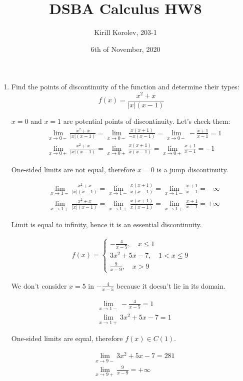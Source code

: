 \documentclass{article}
\title{DSBA Calculus HW8}
\author{Kirill Korolev, 203-1}
\date{6th of November, 2020}
\begin{document}
	
\maketitle

\begin{enumerate}
\item Find the points of discontinuity of the function and determine their types:
\[f(x)=\frac{x^2+x}{|x|(x-1)}\]

$x=0$ and $x=1$ are potential points of discontinuity. Let's check them:
\begin{align*}
&\lim_{x \to 0-} \frac{x^2+x}{|x|(x-1)}=\lim_{x \to 0-} \frac{x(x+1)}{-x(x-1)}=\lim_{x \to 0-} -\frac{x+1}{x-1}=1\\
&\lim_{x \to 0+} \frac{x^2+x}{|x|(x-1)}=\lim_{x \to 0+} \frac{x(x+1)}{x(x-1)}=\lim_{x \to 0+} \frac{x+1}{x-1}=-1
\end{align*}

One-sided limits are not equal, therefore $x=0$ is a jump discontinuity.

\begin{align*}
&\lim_{x \to 1-} \frac{x^2+x}{|x|(x-1)}=\lim_{x \to 1-} \frac{x(x+1)}{x(x-1)}=\lim_{x \to 1-} \frac{x+1}{x-1}=-\infty\\
&\lim_{x \to 1+} \frac{x^2+x}{|x|(x-1)}=\lim_{x \to 1+} \frac{x(x+1)}{x(x-1)}=\lim_{x \to 1+} \frac{x+1}{x-1}=+\infty
\end{align*}

Limit is equal to infinity, hence it is an essential discontinuity.

\begin{align*}
f(x)=
\begin{cases}
-\frac{4}{x-5}, \quad x \leq 1\\
3x^2+5x-7, \quad 1 < x \leq 9\\
\frac{9}{x-9}, \quad x > 9
\end{cases}
\end{align*}

We don't consider $x=5$ in $-\frac{4}{x-5}$ because it doesn't lie in its domain.

\begin{align*}
&\lim_{x \to 1-} -\frac{4}{x-5} = 1\\
&\lim_{x \to 1+} 3x^2+5x-7=1
\end{align*}

One-sided limits are equal, therefore $f(x) \in C(1)$.

\begin{align*}
&\lim_{x \to 9-} 3x^2+5x-7 = 281\\
&\lim_{x \to 9+} \frac{9}{x-9}=+\infty
\end{align*}


\end{enumerate}
\end{document}

